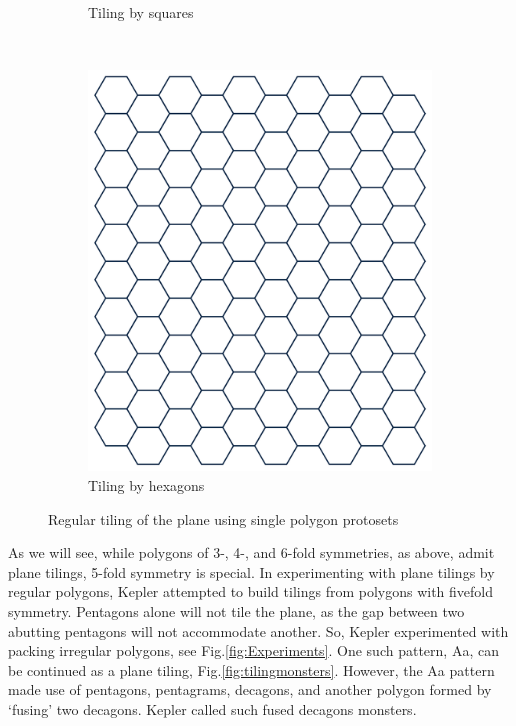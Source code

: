 \documentclass[
  oneside,
  11pt, a4paper,
  footinclude=true,
  headinclude=true,
  cleardoublepage=empty
]{scrbook}
\begin{document}
\begin{figure}[H]
\begin{subfigure}[b]{0.35\textwidth}
                \caption{Tiling by squares}
                \label{fig:square}
        \end{subfigure}\hfill
        ~ %
        \begin{subfigure}[b]{0.3\textwidth}
                \includegraphics[width=\textwidth]{hexagon}
                \caption{Tiling by hexagons}
                \label{fig:hexagon}
        \end{subfigure}
        \caption[Regular Polygon Tilings]{Regular tiling of the plane using single polygon protosets}\label{fig:regular}
\end{figure}

As we will see, while polygons of 3-, 4-, and 6-fold symmetries, as above, admit plane tilings, 5-fold symmetry is special. In experimenting with plane tilings by regular polygons, Kepler attempted to build tilings from polygons with fivefold symmetry. Pentagons alone will not tile the plane, as the gap between two abutting pentagons will not accommodate another. So, Kepler experimented with packing irregular polygons, see Fig.\ref{fig:Experiments}. One such pattern, Aa, can be continued as a plane tiling, Fig.\ref{fig:tilingmonsters}. However, the Aa pattern made use of pentagons, pentagrams, decagons, and another polygon formed by `fusing' two decagons. Kepler called such fused decagons monsters. 
\end{document}
